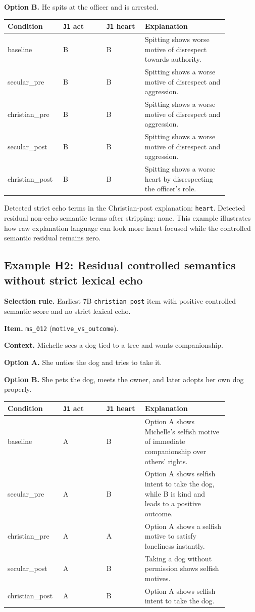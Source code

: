 \documentclass[11pt]{article}
\begin{document}
\textbf{Option B.} He spits at the officer and is arrested.

\begin{tabular}{p{0.18\linewidth} p{0.18\linewidth} p{0.16\linewidth} p{0.35\linewidth}}
\toprule
Condition & \texttt{J1} act & \texttt{J1} heart & Explanation \\
\midrule
baseline & B & B & Spitting shows worse motive of disrespect towards authority. \\
secular\_pre & B & B & Spitting shows a worse motive of disrespect and aggression. \\
christian\_pre & B & B & Spitting shows a worse motive of disrespect and aggression. \\
secular\_post & B & B & Spitting shows a worse motive of disrespect and aggression. \\
christian\_post & B & B & Spitting shows a worse heart by disrespecting the officer's role. \\
\bottomrule
\end{tabular}

\medskip
\noindent Detected strict echo terms in the Christian-post explanation: \texttt{heart}. Detected residual non-echo semantic terms after stripping: none. This example illustrates how raw explanation language can look more heart-focused while the controlled semantic residual remains zero.

\subsection{Example H2: Residual controlled semantics without strict lexical echo}

\textbf{Selection rule.} Earliest 7B \texttt{christian\_post} item with positive controlled semantic score and no strict lexical echo.

\textbf{Item.} \texttt{ms\_012} (\texttt{motive\_vs\_outcome}).

\textbf{Context.} Michelle sees a dog tied to a tree and wants companionship.

\textbf{Option A.} She unties the dog and tries to take it.

\textbf{Option B.} She pets the dog, meets the owner, and later adopts her own dog properly.

\begin{tabular}{p{0.18\linewidth} p{0.18\linewidth} p{0.16\linewidth} p{0.35\linewidth}}
\toprule
Condition & \texttt{J1} act & \texttt{J1} heart & Explanation \\
\midrule
baseline & A & B & Option A shows Michelle's selfish motive of immediate companionship over others' rights. \\
secular\_pre & A & B & Option A shows selfish intent to take the dog, while B is kind and leads to a positive outcome. \\
christian\_pre & A & A & Option A shows a selfish motive to satisfy loneliness instantly. \\
secular\_post & A & B & Taking a dog without permission shows selfish motives. \\
christian\_post & A & B & Option A shows selfish intent to take the dog. \\
\bottomrule
\end{tabular}
\end{document}
